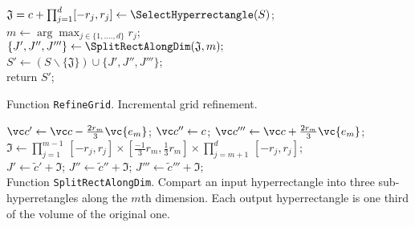 \begin{algorithm}
\begin{small}

%
\BlankLine
$\mathfrak J = c+ \prod_{j =1}^d [-r_j,r_j] \leftarrow \SelectHyperrectangle(S)$;\\ %
$ m \leftarrow \arg \max_{j \in \{1,....,d\}} r_j$;\\
$\{J',J'',J'''\} \leftarrow \SplitRectAlongDim (\mathfrak J,m);$\\
$S' \leftarrow (S \backslash \{\mathfrak J\}) \cup \{J', J'', J'''\}$;\\
return $S'$;

\caption{Function \texttt{RefineGrid}. Incremental grid refinement.}

\label{alg:incgridrefinement1}
\end{small}
\end{algorithm}


\begin{algorithm}
\begin{small}

%
\BlankLine
$\vc c' \leftarrow \vc c - \frac{2 r_m}{3} \vc{e_m}$; $\vc c'' \leftarrow c$;
$\vc c''' \leftarrow \vc c + \frac{2 r_m}{3} \vc{e_m}$;\\
$\mathfrak I \leftarrow   \prod_{j =1}^{m-1} \, [-r_{j},r_{j}] \times [\frac{-1}{3} r_m,\frac{1}{3}r_m]\times \prod_{j =m+1}^d \, [-r_{j},r_{j}] $;\\
$J' \leftarrow \tilde c' + \mathfrak I$; $J'' \leftarrow \tilde c'' + \mathfrak I$; $J''' \leftarrow \tilde c''' + \mathfrak I$;\\

\caption{Function \texttt{SplitRectAlongDim}. Compart an input hyperrectangle into three sub-hyperretangles along the $m$th dimension. Each output hyperrectangle is one third of the volume of the original one. }

\label{alg:incgridrefinement1}
\end{small}
\end{algorithm}


